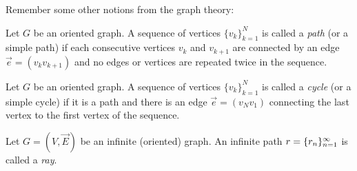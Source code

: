 \documentclass[12pt]{amsart}
\begin{document}
    Remember some other notions from the graph theory:
    \begin{definition}
      Let $G$ be an oriented graph.
      A sequence of vertices $\{v_k\}_{k=1}^N$ is called a \emph{path} (or a simple path) if each consecutive vertices
        $v_k$ and $v_{k+1}$ are connected by an edge $\vec{e} = (v_k v_{k+1})$ and no edges or vertices are repeated twice in the sequence.
    \end{definition}
    \begin{definition}
      Let $G$ be an oriented graph.
      A sequence of vertices $\{v_k\}_{k=1}^N$ is called a \emph{cycle} (or a simple cycle) if it is
        a path and there is an edge $\vec{e} = (v_N v_1)$ connecting the last vertex to the first vertex of the sequence.
    \end{definition}
    \begin{definition}
      Let $G = (V, \vec{E})$ be an infinite (oriented) graph.
      An infinite path $r = \{{r}_n\}_{n=1}^\infty$ is called a \emph{ray}.
    \end{definition}
\end{document}
